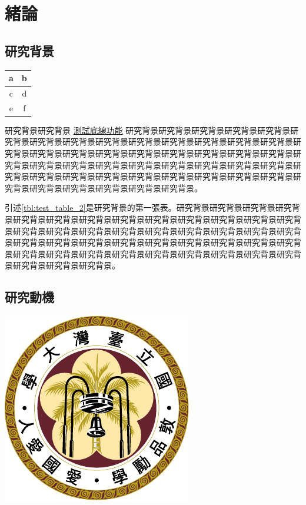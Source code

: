 
\chapter{緒論}

\section{研究背景}

\begingroup
\centering
\begin{tabular}{|c|c|}
\hline
a & b \\\hline
c & d \\\hline
e & f \\\hline
\hline
\end{tabular}
\captionsetup{type=table}
\label{tbl:test_table_2}

\endgroup

研究背景研究背景
\uline{測試底線功能}
研究背景研究背景研究背景研究背景研究背景研究背景研究背景研究背景研究背景研究背景研究背景研究背景研究背景研究背景研究背景研究背景研究背景研究背景研究背景研究背景研究背景研究背景研究背景研究背景研究背景研究背景研究背景研究背景研究背景研究背景研究背景研究背景研究背景研究背景研究背景研究背景研究背景研究背景研究背景研究背景研究背景研究背景研究背景研究背景研究背景研究背景研究背景。\par

引述\ref{tbl:test_table_2}是研究背景的第一張表。研究背景研究背景研究背景研究背景研究背景研究背景研究背景研究背景研究背景研究背景研究背景研究背景研究背景研究背景研究背景研究背景研究背景研究背景研究背景研究背景研究背景研究背景研究背景研究背景研究背景研究背景研究背景研究背景研究背景研究背景研究背景研究背景研究背景研究背景研究背景研究背景研究背景研究背景研究背景研究背景研究背景研究背景研究背景。

\section{研究動機}
\begingroup
\centering
\includegraphics{figures/seal.pdf}
\captionsetup{type=figure}
\label{fig:test_fig_1}
\endgroup

